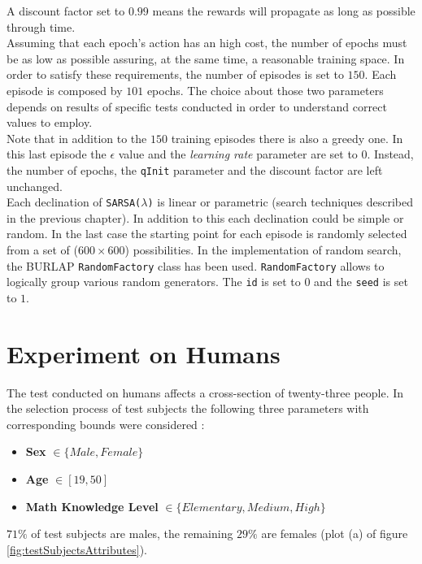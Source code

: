 A discount factor set to $0.99$ means the rewards will propagate as long as possible through time. \\

Assuming that each epoch's action has an high cost, the number of epochs must be as low as possible assuring, at the same time, a reasonable training space. In order to satisfy these requirements, the number of episodes is set to $150$. Each episode is composed by $101$ epochs. The choice about those two parameters depends on results of specific tests conducted in order to understand correct values to employ. \\

Note that in addition to the $150$ training episodes there is also a greedy one. In this last episode the $\epsilon$ value and the \textit{learning rate} parameter are set to $0$. Instead, the number of epochs, the {\tt qInit} parameter and the discount factor are left unchanged.  \\

Each declination of {\tt SARSA(\textit{$\lambda$})} is linear or parametric (search techniques described in the previous chapter). In addition to this each declination could be simple or random. In the last case the starting point for each episode is randomly selected from a set of ($600 \times 600$) possibilities. In the implementation of random search, the BURLAP {\tt RandomFactory} class has been used. {\tt RandomFactory} allows to logically group various random generators. The {\tt id} is set to $0$ and the {\tt seed} is set to $1$.

\section{Experiment on Humans}

The test conducted on humans affects a cross-section of twenty-three people. In the selection process of test subjects the following three parameters with corresponding bounds were considered :

\begin{itemize}
	\item \textbf{Sex} $\in \{Male, Female\}$
	\item \textbf{Age} $\in [19, 50]$
	\item \textbf{Math Knowledge Level} $\in \{Elementary, Medium, High\}$ 
\end{itemize} 

$71\%$ of test subjects are males, the remaining $29\%$ are females (plot (a) of figure \ref{fig:testSubjectsAttributes}). \\

